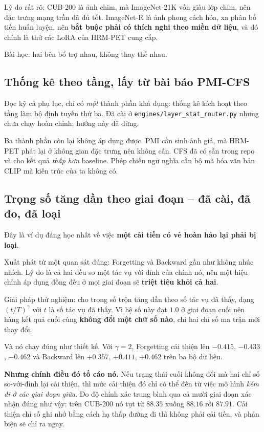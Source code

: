 \documentclass[11pt,a4paper]{article}
\newenvironment{luuy}{\begin{leftbar}\noindent\ignorespaces}{\end{leftbar}}
\begin{document}
Lý do rất rõ: CUB-200 là ảnh chim, mà ImageNet-21K vốn giàu lớp chim, nên đặc
trưng mạng trần đã đủ tốt. ImageNet-R là ảnh phong cách hóa, xa phân bố tiền huấn
luyện, nên \textbf{bắt buộc phải có thích nghi theo miền dữ liệu}, và đó chính là
thứ các LoRA của HRM-PET cung cấp.

Bài học: hai bên bổ trợ nhau, không thay thế nhau.

\subsection{Thống kê theo tầng, lấy từ bài báo PMI-CFS}

Đọc kỹ cả phụ lục, chỉ có \emph{một} thành phần khả dụng: thống kê kích hoạt theo
tầng làm bộ định tuyến thứ ba. Đã cài ở
\texttt{engines/layer\_stat\_router.py} nhưng chưa chạy hoàn chỉnh; hướng này đã
dừng.

Ba thành phần còn lại không áp dụng được. PMI cần sinh ảnh giả, mà HRM-PET phát
lại ở không gian đặc trưng nên không cần. CFS đã có sẵn trong repo và cho kết quả
\emph{thấp hơn} baseline. Phép chiếu ngữ nghĩa cần bộ mã hóa văn bản CLIP mà kiến
trúc của ta không có.

\subsection{Trọng số tăng dần theo giai đoạn -- đã cài, đã đo, đã loại}
\label{sec:ramp}

Đây là ví dụ đáng học nhất về việc \textbf{một cải tiến có vẻ hoàn hảo lại phải
bị loại}.

Xuất phát từ một quan sát đúng: Forgetting và Backward gần như không nhúc nhích.
Lý do là cả hai đều so một tác vụ với đỉnh của chính nó, nên một hiệu chỉnh áp
dụng đồng đều ở mọi giai đoạn sẽ \textbf{triệt tiêu khỏi cả hai}.

Giải pháp thử nghiệm: cho trọng số trộn tăng dần theo số tác vụ đã thấy, dạng
$(t/T)^{\gamma}$ với $t$ là số tác vụ đã thấy. Vì hệ số này đạt
$1.0$ ở giai đoạn cuối
nên hàng kết quả cuối cùng \textbf{không đổi một chữ số nào}, chỉ hai chỉ số ma
trận mới thay đổi.

Và nó chạy đúng như thiết kế. Với $\gamma = 2$, Forgetting cải thiện lên $-0.415$,
$-0.433$, $-0.462$ và Backward lên $+0.357$, $+0.411$, $+0.462$ trên ba bộ dữ
liệu.

\begin{luuy}
\textbf{Nhưng chính điều đó tố cáo nó.} Nếu trạng thái cuối không đổi mà hai chỉ
số so-với-đỉnh lại cải thiện, thì mức cải thiện đó chỉ có thể đến từ việc mô hình
\emph{kém đi ở các giai đoạn giữa}. Đo độ chính xác trung bình qua cả mười giai
đoạn xác nhận đúng như vậy: trên CUB-200 nó tụt từ $88.35$ xuống $88.16$ rồi
$87.91$. Cải thiện chỉ số ghi nhớ bằng cách hạ thấp đường đi thì không phải cải
tiến, và phản biện sẽ chỉ ra ngay.
\end{luuy}
\end{document}
